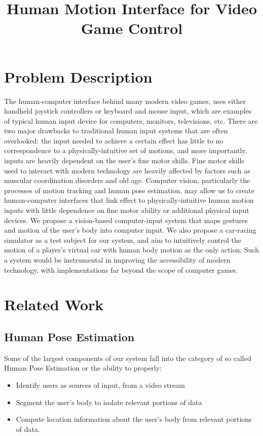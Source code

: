 \documentclass[10pt,twocolumn,letterpaper]{article}
\begin{document}
\title{Human Motion Interface for Video Game Control}
\maketitle

\section{Problem Description}
The human-computer interface behind many modern video games, uses either handheld 
joystick controllers or keyboard and mouse input, which are examples
of typical human input device for computers, monitors, televisions, etc. There are two 
major drawbacks to traditional human input systems that are often overlooked: the input needed 
to achieve a certain effect has little to no correspondence to a physically-intuitive set 
of motions, and more importantly, inputs are heavily dependent on the user's fine motor skills. 
Fine motor skills used to interact with modern technology are heavily affected by factors such 
as muscular coordination disorders and old age. Computer vision, particularly the processes 
of motion tracking and human pose estimation, may allow us to create human-computer interfaces 
that link effect to physically-intuitive human motion inputs with little dependence on 
fine motor ability or additional physical input devices. We propose a vision-based computer-input system that maps gestures and 
motion of the user's body into computer input. We also propose a car-racing simulator as a test 
subject for our system, and aim to intuitively control the motion of a player's virtual car 
with human body motion as the only action. Such a system would be instrumental in improving 
the accessibility of modern technology, with implementations far beyond the scope of computer 
games.

\section{Related Work}
\subsection{Human Pose Estimation}
Some of the largest components of our system fall into the category of so called Human 
Pose Estimation or the ability to properly:

\begin{itemize}
    \item Identify users as sources of input, from a video stream
    \item Segment the user's body to isolate relevant portions of data
    \item Compute location information about the user's body from relevant portions of data.
\end{itemize}
\end{document}
